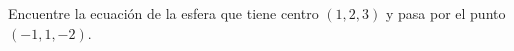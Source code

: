 \item Encuentre la ecuación de la esfera que tiene centro $(1, 2, 3)$ y pasa por el punto $(-1, 1, -2)$.
